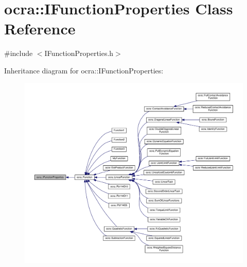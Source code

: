 \hypertarget{classocra_1_1IFunctionProperties}{}\section{ocra\+:\+:I\+Function\+Properties Class Reference}
\label{classocra_1_1IFunctionProperties}


{\ttfamily \#include $<$I\+Function\+Properties.\+h$>$}



Inheritance diagram for ocra\+:\+:I\+Function\+Properties\+:
\nopagebreak
\begin{figure}[H]
\begin{center}
\leavevmode
\includegraphics[width=350pt]{d3/db7/classocra_1_1IFunctionProperties__inherit__graph}
\end{center}
\end{figure}
